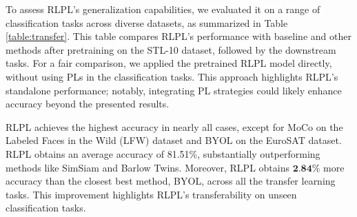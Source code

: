 To assess RLPL's generalization capabilities, we evaluated it on a range of classification tasks across diverse datasets, as summarized in Table \ref{table:transfer}. This table compares RLPL's performance with baseline and other methods after pretraining on the STL-10 dataset, followed by the downstream tasks. For a fair comparison, we applied the pretrained RLPL model directly, without using PLs in the classification tasks. This approach highlights RLPL's standalone performance; notably, integrating PL strategies could likely enhance accuracy beyond the presented results.

RLPL achieves the highest accuracy in nearly all cases, except for MoCo on the Labeled Faces in the Wild (LFW) dataset and BYOL on the EuroSAT dataset. RLPL obtains an average accuracy of 81.51\%, substantially outperforming methods like SimSiam and Barlow Twins. Moreover, RLPL obtains $\textbf{2.84\%}$ more accuracy than the closest best method, BYOL, across all the transfer learning tasks. This improvement highlights RLPL's transferability on unseen classification tasks.
